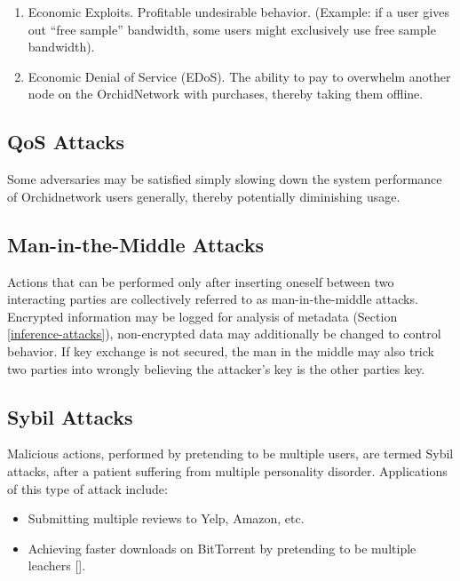 \documentclass{article}
\newcommand{\orchid}{Orchid}
\newcommand{\Orchid}{\orchid}
\begin{document}
\begin{enumerate}
\item Economic Exploits. Profitable undesirable behavior. (Example: if a user gives out “free sample” bandwidth, some users might exclusively use free sample bandwidth).
\item Economic Denial of Service (EDoS). The ability to pay to overwhelm another node on the \Orchid Network with purchases, thereby taking them offline.
\end{enumerate}

\subsection{QoS Attacks}
\label{qos}

Some adversaries may be satisfied simply slowing down the system performance of \Orchid network users generally, thereby potentially diminishing usage.

\subsection{Man-in-the-Middle Attacks}
\label{mitm}

Actions that can be performed only after inserting oneself between two interacting parties are collectively referred to as man-in-the-middle attacks. Encrypted information may be logged for analysis of metadata (Section \ref{inference-attacks}), non-encrypted data may additionally be changed to control behavior. If key exchange is not secured, the man in the middle may also trick two parties into wrongly believing the attacker's key is the other parties key.

\subsection{Sybil Attacks}

Malicious actions, performed by pretending to be multiple users, are termed Sybil attacks, after a patient suffering from multiple personality disorder. Applications of this type of attack include:

\begin{itemize}
\item Submitting multiple reviews to Yelp, Amazon, etc.
\item Achieving faster downloads on BitTorrent by pretending to be multiple leachers [\cite{freeridingBittorrent}].
\end{itemize}
\end{document}
